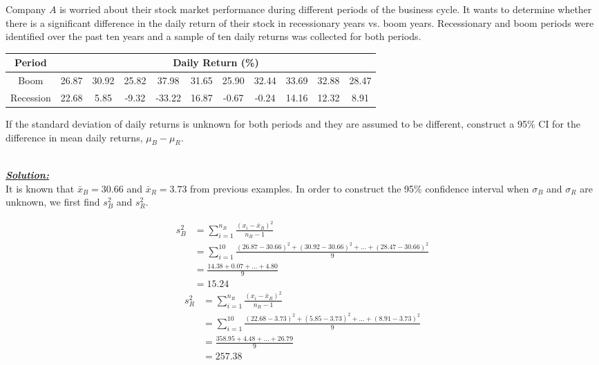 \begin{example}
Company $A$ is worried about their stock market performance during different periods of the business cycle. It wants to determine whether there is a significant difference in the daily return of their stock in recessionary years vs. boom years. Recessionary and boom periods were identified over the past ten years and a sample of ten daily returns was collected for both periods. 

\begin{center}
\begin{tabular}{c|c|c|c|c|c|c|c|c|c|c}
\def\arraystretch{2}
Period & \multicolumn{10}{c}{Daily Return (\%)} \\ 
\hline %
Boom & 26.87& 30.92 &25.82& 37.98& 31.65& 25.90 &32.44 &33.69& 32.88& 28.47 \\ 
\hline 
Recession & 22.68  & 5.85&  -9.32& -33.22&  16.87  &-0.67 & -0.24 & 14.16&  12.32&   8.91
\end{tabular} 
\end{center}

If the standard deviation of daily returns is unknown for both periods and they are assumed to be different, construct a 95\% CI for the difference in mean daily returns, $\mu_B - \mu_R$.


\hfill\\
{\emph{\textbf{\underline{Solution:}}}}\\


It is known that $\bar{x}_B = 30.66$ and $\bar{x}_R=3.73$ from previous examples. In order to construct the 95\% confidence interval when $\sigma_B$ and $\sigma_R$ are unknown, we first find $s^2_B$ and $s^2_R$. 

\begin{align*}
s^{2}_B &= \sum_{i=1}^{n_B} \frac{(x_i - \bar{x}_B)^2}{n_B-1} \\
		&= \sum_{i=1}^{10}\frac{ (26.87-30.66)^2+(30.92-30.66)^2+\hdots + (28.47-30.66)^2}{9} \\
		&= \frac{14.38+ 0.07+ \hdots + 4.80}{9} \\
		&= 15.24
\end{align*}
\begin{align*}
s^{2}_R &= \sum_{i=1}^{n_R} \frac{(x_i - \bar{x}_R)^2}{n_R-1} \\
		&= \sum_{i=1}^{10}\frac{ (22.68-3.73)^2+(5.85-3.73)^2+\hdots + (8.91-3.73)^2}{9} \\
		&= \frac{358.95+ 4.48+ \hdots + 26.79}{9} \\
		&= 257.38
\end{align*} 


\end{example}

